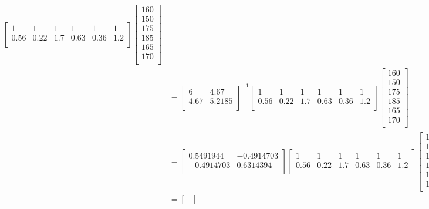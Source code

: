 \documentclass[a4paper]{article}
\begin{document}
{\begin{enumerate}
\begin{align*}
\begin{bmatrix}
1 & 1 & 1 & 1 & 1 & 1 \\
0.56 & 0.22 & 1.7 & 0.63 & 0.36 &  1.2   \\
\end{bmatrix}
\begin{bmatrix}
160  \\
150  \\
175  \\
185  \\
165  \\
170  \\
\end{bmatrix} \\ &=
\begin{bmatrix}
6 & 4.67  \\
4.67 & 5.2185   \\
\end{bmatrix}^{-1}
\begin{bmatrix}
1 & 1 & 1 & 1 & 1 & 1 \\
0.56 & 0.22 & 1.7 & 0.63 & 0.36 &  1.2   \\
\end{bmatrix}
\begin{bmatrix}
160  \\
150  \\
175  \\
185  \\
165  \\
170  \\
\end{bmatrix} \\ &=
 \begin{bmatrix}
0.5491944 & -0.4914703  \\
-0.4914703  & 0.6314394   \\
\end{bmatrix}
\begin{bmatrix}
1 & 1 & 1 & 1 & 1 & 1 \\
0.56 & 0.22 & 1.7 & 0.63 & 0.36 &  1.2   \\
\end{bmatrix}
\begin{bmatrix}
160  \\
150  \\
175  \\
185  \\
165  \\
170  \\
\end{bmatrix} \\
&= \begin{bmatrix}

\end{bmatrix}
\end{align*}
\end{enumerate}}
\end{document}
